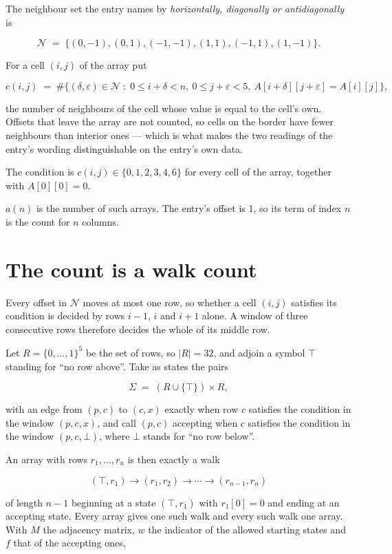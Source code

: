 \documentclass[11pt]{article}
\theoremstyle{definition}
\begin{document}
The neighbour set the entry names by {\itshape horizontally, diagonally or antidiagonally} is

\[\mathcal{N} \;=\; \{(0,-1), (0,1), (-1,-1), (1,1), (-1,1), (1,-1)\}.\]

For a cell $(i,j)$ of the array put

\[c(i,j) \;=\; \#\bigl\{(\delta,\varepsilon)\in\mathcal{N} \;:\; 0\le i+\delta<n,\ 0\le j+\varepsilon<5,\ A[i+\delta][j+\varepsilon] = A[i][j]\bigr\},\]

the number of neighbours of the cell whose value is equal to the cell's own. Offsets that leave the array are not counted, so cells on the border have fewer neighbours than interior ones --- which is what makes the two readings of the entry's wording distinguishable on the entry's own data.

The condition is $c(i,j) \in \{0, 1, 2, 3, 4, 6\}$ for every cell of the array, together with $A[0][0]=0$.

$a(n)$ is the number of such arrays. The entry's offset is 1, so its term of index $n$ is the count for $n$ columns.

\section{The count is a walk count}

Every offset in $\mathcal{N}$ moves at most one row, so whether a cell $(i,j)$ satisfies its condition is decided by rows $i-1$, $i$ and $i+1$ alone. A window of three consecutive rows therefore decides the whole of its middle row.

Let $R = \{0,\dots,1\}^{5}$ be the set of rows, so $|R| = 32$, and adjoin a symbol $\top$ standing for ``no row above''. Take as states the pairs

\[\Sigma \;=\; (R \cup \{\top\}) \times R,\]

with an edge from $(p,c)$ to $(c,x)$ exactly when row $c$ satisfies the condition in the window $(p,c,x)$, and call $(p,c)$ accepting when $c$ satisfies the condition in the window $(p,c,\bot)$, where $\bot$ stands for ``no row below''.

An array with rows $r_1,\dots,r_n$ is then exactly a walk

\[(\top,r_1) \to (r_1,r_2) \to \cdots \to (r_{n-1},r_n)\]

of length $n-1$ beginning at a state $(\top,r_1)$ with $r_1[0]=0$ and ending at an accepting state. Every array gives one such walk and every such walk one array. With $M$ the adjacency matrix, $w$ the indicator of the allowed starting states and $f$ that of the accepting ones,
\end{document}

